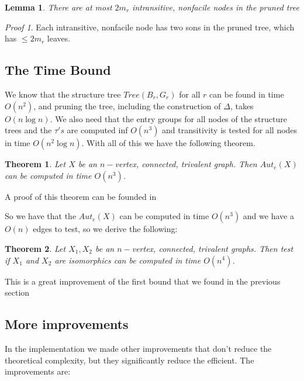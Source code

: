 \documentclass[12pt,a4paper]{book}
\theoremstyle{plain}
\newtheorem{theorem}{Theorem}
\newtheorem{lema}{Lemma}
\theoremstyle{definition}
\theoremstyle{remark}
\newtheorem*{Proof}{Proof}
\begin{document}
\begin{lema}
 There are at most $2 m_r$ intransitive, nonfacile nodes in the pruned tree
\end{lema}

\begin{Proof}
 Each intransitive, nonfacile node has two sons in the pruned tree, which has $\leq 2 m_r$ leaves.
\end{Proof}

\subsection{The Time Bound}

We know that the structure tree $Tree(B_r, G_r)$ for all $r$ can be found in time $O(n^2)$, and pruning the tree, including the 
construction of $\Delta$, takes $O(n \log n)$. We also need that the entry groups for all nodes of the structure trees and the 
$\tau's$ are computed inf $O(n^3)$ and transitivity is tested for all nodes in time $O(n^2 \log n)$. With all of this we have the 
following theorem.

\begin{theorem}
 Let $X$ be an $n-$vertex, connected, trivalent graph. Then $Aut_e(X)$ can be computed in time $O(n^3)$.
\end{theorem}

A proof of this theorem can be founded in \cite{GaHoLuScWe87}

So we have that the $Aut_e(X)$ can be computed in time $O(n^3)$ and we have a $O(n)$ edges to test, so we derive the following:

\begin{theorem}
 Let $X_1, X_2$ be an $n-$vertex, connected, trivalent graphs. Then test if $X_1$ and $X_2$ are isomorphics can be computed 
 in time $O(n^4)$.
\end{theorem}

This is a great improvement of the first bound that we found in the previous section

\subsection{ More improvements}
In the implementation we made other improvements that don't reduce the theoretical complexity, but they significantly reduce the 
efficient. The improvements are:
\end{document}
